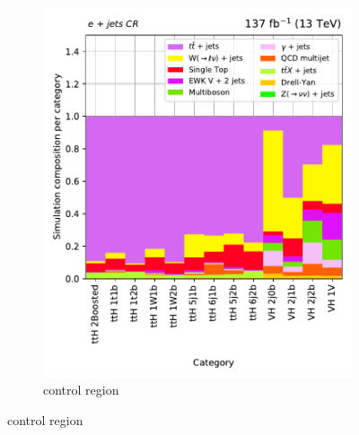 \begin{figure}[htbp]
\begin{subfigure}[b]{0.33\textwidth}
        \includegraphics[width=\textwidth]{figures/region_plots/full_Run2/region_3/background_composition.pdf}
        \caption{\singleEleCr control region}
    \end{subfigure}


\end{figure}
